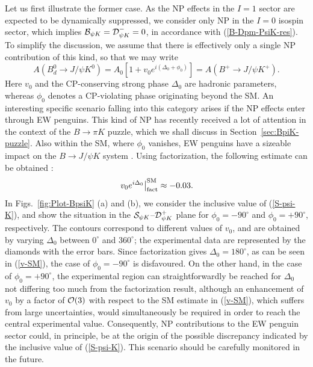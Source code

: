 \documentclass[12pt]{article}
\begin{document}
Let us first illustrate 
the former case. As the NP effects in the $I=1$ sector are expected to be 
dynamically suppressed, we consider only NP in the $I=0$ isospin sector,
which implies ${\cal B}_{\psi K} ={\cal D}^-_{\psi K}=0$, in accordance with
(\ref{B-Dpm-PsiK-res}). To simplify the discussion, we assume that there is 
effectively only a single NP contribution of this kind, so that we may write
\begin{equation}\label{ApsiK-NP}
A(B^0_d\to J/\psi K^0)=A_0\left[1+v_0e^{i(\Delta_0+\phi_0)}\right]=A(B^+\to J/\psi K^+).
\end{equation}
Here $v_0$ and the CP-conserving strong phase $\Delta_0$ are hadronic parameters,
whereas $\phi_0$ denotes a CP-violating phase originating beyond the SM. 
An interesting specific scenario falling into this category arises if the NP effects
enter through EW penguins. This kind of NP has recently received a lot of attention 
in the context of the $B\to\pi K$ puzzle, which we shall discuss in 
Section~\ref{sec:BpiK-puzzle}. Also within the SM, where $\phi_0$ vanishes, 
EW penguins have a sizeable impact on the $B\to J/\psi K$ system \cite{RF-EWP-rev}.
Using factorization, the following estimate can be obtained \cite{BFRS3}:
\begin{equation}\label{v-SM}
\left. v_0e^{i\Delta_0}\right|_{\rm fact}^{\rm SM}\approx -0.03.
\end{equation}
In Figs.~\ref{fig:Plot-BpsiK} (a) and (b), we consider the inclusive value of
(\ref{S-psi-K}), and show the situation in the
${\cal S}_{\psi K}$--${\cal D}^+_{\psi K}$ plane for $\phi_0=-90^\circ$
and $\phi_0=+90^\circ$, respectively. The contours correspond to 
different values of $v_0$, and are obtained by varying $\Delta_0$ between 
$0^\circ$ and $360^\circ$; the experimental data are represented by the diamonds
with the error bars. Since factorization gives $\Delta_0=180^\circ$, as can be
seen in (\ref{v-SM}), the case of $\phi_0=-90^\circ$ is disfavoured. On the
other hand, in the case of $\phi_0=+90^\circ$, the experimental region can straightforwardly be reached for $\Delta_0$ not differing too much from the
factorization result, although an enhancement of $v_0$ by a factor of 
${\cal O}(3)$ with respect to the SM estimate in (\ref{v-SM}), which suffers from 
large uncertainties, would simultaneously be required in order to reach the central 
experimental value. Consequently, NP contributions to the EW penguin sector 
could, in principle, be at the origin of the possible discrepancy indicated by the
inclusive value of (\ref{S-psi-K}). This scenario should be carefully monitored in
the future.
\end{document}
